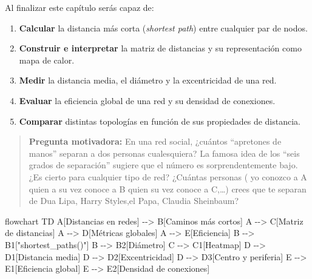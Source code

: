 \documentclass[
  letterpaper,
  DIV=11,
  numbers=noendperiod]{scrreprt}
\newenvironment{Shaded}{\begin{snugshade}}{\end{snugshade}}
\newcommand{\NormalTok}[1]{\textcolor[rgb]{0.00,0.23,0.31}{#1}}
\providecommand{\tightlist}{%
  \setlength{\itemsep}{0pt}\setlength{\parskip}{0pt}}
\begin{document}
\begin{tcolorbox}[enhanced jigsaw, toprule=.15mm, colframe=quarto-callout-note-color-frame, coltitle=black, titlerule=0mm, colback=white, breakable, leftrule=.75mm, arc=.35mm, bottomtitle=1mm, toptitle=1mm, rightrule=.15mm, bottomrule=.15mm, left=2mm, title=\textcolor{quarto-callout-note-color}{\faInfo}\hspace{0.5em}{🎯 Objetivos de aprendizaje}, colbacktitle=quarto-callout-note-color!10!white, opacityback=0, opacitybacktitle=0.6]

Al finalizar este capítulo serás capaz de:

\begin{enumerate}
\def\labelenumi{\arabic{enumi}.}
\tightlist
\item
  \textbf{Calcular} la distancia más corta (\emph{shortest path}) entre
  cualquier par de nodos.
\item
  \textbf{Construir e interpretar} la matriz de distancias y su
  representación como mapa de calor.
\item
  \textbf{Medir} la distancia media, el diámetro y la excentricidad de
  una red.
\item
  \textbf{Evaluar} la eficiencia global de una red y su densidad de
  conexiones.
\item
  \textbf{Comparar} distintas topologías en función de sus propiedades
  de distancia.
\end{enumerate}

\end{tcolorbox}

\begin{quote}
\textbf{Pregunta motivadora:} En una red social, ¿cuántos ``apretones de
manos'' separan a dos personas cualesquiera? La famosa idea de los
``seis grados de separación'' sugiere que el número es sorprendentemente
bajo. ¿Es cierto para cualquier tipo de red? ¿Cuántas personas ( yo
conozco a A quien a su vez conoce a B quien su vez conoce a C,\ldots)
crees que te separan de Dua Lipa, Harry Styles,el Papa, Claudia
Sheinbaum?
\end{quote}

\begin{Shaded}
\begin{Highlighting}[]
\NormalTok{flowchart TD}
\NormalTok{    A[Distancias en redes] {-}{-}\textgreater{} B[Caminos más cortos]}
\NormalTok{    A {-}{-}\textgreater{} C[Matriz de distancias]}
\NormalTok{    A {-}{-}\textgreater{} D[Métricas globales]}
\NormalTok{    A {-}{-}\textgreater{} E[Eficiencia]}
\NormalTok{    B {-}{-}\textgreater{} B1["shortest\_paths()"]}
\NormalTok{    B {-}{-}\textgreater{} B2[Diámetro]}
\NormalTok{    C {-}{-}\textgreater{} C1[Heatmap]}
\NormalTok{    D {-}{-}\textgreater{} D1[Distancia media]}
\NormalTok{    D {-}{-}\textgreater{} D2[Excentricidad]}
\NormalTok{    D {-}{-}\textgreater{} D3[Centro y periferia]}
\NormalTok{    E {-}{-}\textgreater{} E1[Eficiencia global]}
\NormalTok{    E {-}{-}\textgreater{} E2[Densidad de conexiones]}
\end{Highlighting}
\end{Shaded}
\end{document}
